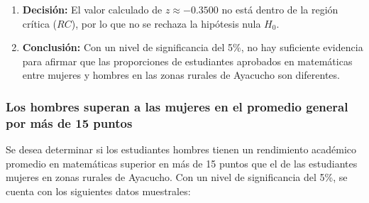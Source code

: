 \documentclass[
]{article}
\begin{document}
\begin{enumerate}
  \item \textbf{Decisión:}
    El valor calculado de \( z \approx -0.3500 \) no está dentro de la región crítica (\(RC\)), por lo que no se rechaza la hipótesis nula \(H_0\).
    
  \item \textbf{Conclusión:}
    Con un nivel de significancia del 5\%, no hay suficiente evidencia para afirmar que las proporciones de estudiantes aprobados en matemáticas entre mujeres y hombres en las zonas rurales de Ayacucho son diferentes.
\end{enumerate}

\subsubsection*{Los hombres superan a las mujeres en el promedio general
por más de 15
puntos}\label{los-hombres-superan-a-las-mujeres-en-el-promedio-general-por-muxe1s-de-15-puntos}

Se desea determinar si los estudiantes hombres tienen un rendimiento
académico promedio en matemáticas superior en más de 15 puntos que el de
las estudiantes mujeres en zonas rurales de Ayacucho. Con un nivel de
significancia del 5\%, se cuenta con los siguientes datos muestrales:
\end{document}
